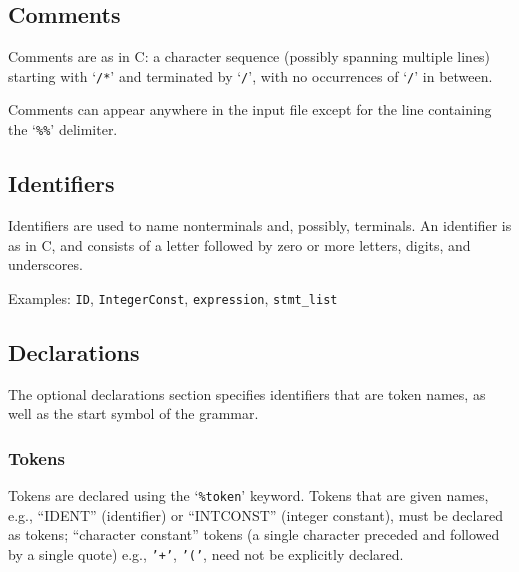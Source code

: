 \documentclass{article}
\begin{document}
\subsection{Comments}

Comments are as in C: a character sequence (possibly spanning multiple
lines) starting with `{\tt /*}' and terminated by `{\tt */}', with
no occurrences of `{\tt */}' in between.

Comments can appear anywhere in the input file except for the line
containing the `{\tt \%\%}' delimiter.

\subsection{Identifiers}\label{sec:ID}

Identifiers are used to name nonterminals and, possibly, terminals.
An identifier is as in C, and consists of a letter followed by zero or more
letters, digits, and underscores.

Examples: {\tt ID}, {\tt IntegerConst}, {\tt expression}, {\tt stmt\_list}

\subsection{Declarations}

The optional declarations section specifies identifiers that are token
names, as well as the start symbol of the grammar.

\subsubsection{Tokens}\label{sec:tokens}

Tokens are declared using the `{\tt \%token}' keyword.  Tokens that
are given names, e.g., ``IDENT'' (identifier) or ``INTCONST'' (integer
constant), must be declared as tokens; ``character constant'' tokens
(a single character preceded and followed by a single quote)
e.g., {\tt '+'}, {\tt '('}, need not be explicitly declared.
\end{document}
